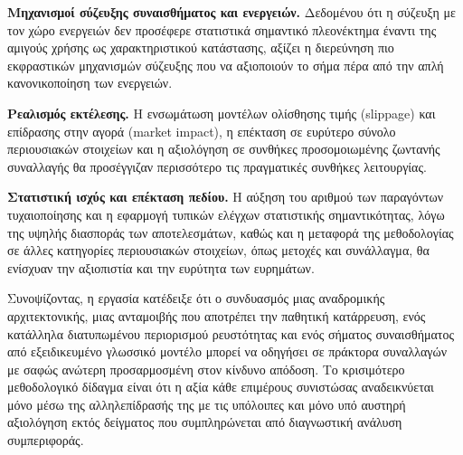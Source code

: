 \textbf{Μηχανισμοί σύζευξης συναισθήματος και ενεργειών.} Δεδομένου ότι η σύζευξη
με τον χώρο ενεργειών δεν προσέφερε στατιστικά σημαντικό πλεονέκτημα έναντι της αμιγούς
χρήσης ως χαρακτηριστικού κατάστασης, αξίζει η διερεύνηση πιο εκφραστικών μηχανισμών
σύζευξης που να αξιοποιούν το σήμα πέρα από την απλή κανονικοποίηση των ενεργειών.

\textbf{Ρεαλισμός εκτέλεσης.} Η ενσωμάτωση μοντέλων ολίσθησης τιμής (slippage) και
επίδρασης στην αγορά (market impact), η επέκταση σε ευρύτερο σύνολο περιουσιακών στοιχείων
και η αξιολόγηση σε συνθήκες προσομοιωμένης ζωντανής συναλλαγής θα προσέγγιζαν περισσότερο
τις πραγματικές συνθήκες λειτουργίας.

\textbf{Στατιστική ισχύς και επέκταση πεδίου.} Η αύξηση του αριθμού των παραγόντων
τυχαιοποίησης και η εφαρμογή τυπικών ελέγχων στατιστικής σημαντικότητας, λόγω της υψηλής
διασποράς των αποτελεσμάτων, καθώς και η μεταφορά της μεθοδολογίας σε άλλες κατηγορίες
περιουσιακών στοιχείων, όπως μετοχές και συνάλλαγμα, θα ενίσχυαν την αξιοπιστία και την
ευρύτητα των ευρημάτων.

Συνοψίζοντας, η εργασία κατέδειξε ότι ο συνδυασμός μιας αναδρομικής αρχιτεκτονικής, μιας
ανταμοιβής που αποτρέπει την παθητική κατάρρευση, ενός κατάλληλα διατυπωμένου περιορισμού
ρευστότητας και ενός σήματος συναισθήματος από εξειδικευμένο γλωσσικό μοντέλο μπορεί να
οδηγήσει σε πράκτορα συναλλαγών με σαφώς ανώτερη προσαρμοσμένη στον κίνδυνο απόδοση. Το
κρισιμότερο μεθοδολογικό δίδαγμα είναι ότι η αξία κάθε επιμέρους συνιστώσας αναδεικνύεται
μόνο μέσω της αλληλεπίδρασής της με τις υπόλοιπες και μόνο υπό αυστηρή αξιολόγηση εκτός
δείγματος που συμπληρώνεται από διαγνωστική ανάλυση συμπεριφοράς.

